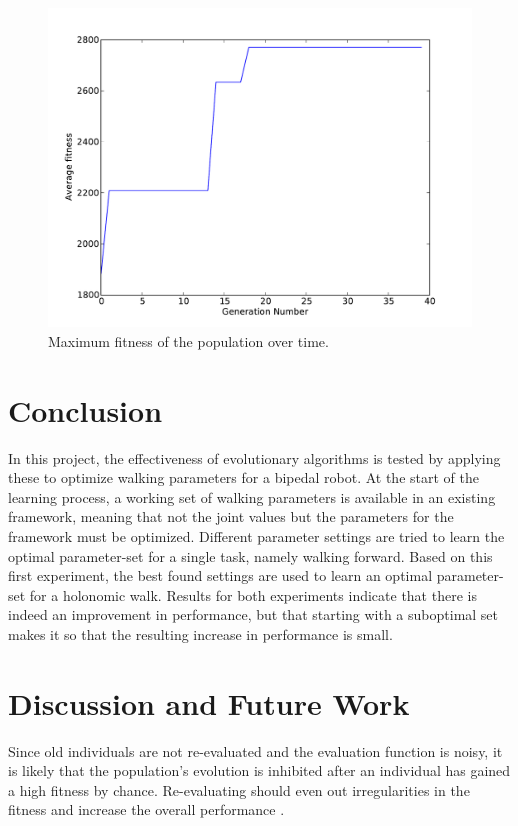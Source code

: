 \documentclass{article}
\begin{document}
\begin{figure}[h!]
	\center
	\includegraphics[width=.8\textwidth]{images/max_fitness}
	\caption{Maximum fitness of the population over time.}
	\label{fig:max}
\end{figure}
\newpage

\section{Conclusion}
In this project, the effectiveness of evolutionary algorithms is tested by applying these to optimize walking parameters for a bipedal robot. At the start of the learning process, a working set of walking parameters is available in an existing framework, meaning that not the joint values but the parameters for the framework must be optimized. Different parameter settings are tried to learn the optimal parameter-set for a single task, namely walking forward. Based on this first experiment, the best found settings are used to learn an optimal parameter-set for a holonomic walk. Results for both experiments indicate that there is indeed an improvement in performance, but that starting with a suboptimal set makes it so that the resulting increase in performance is small.

\section{Discussion and Future Work}
Since old individuals are not re-evaluated and the evaluation function is
noisy, it is likely that the population's evolution is inhibited after an
individual has gained a high fitness by chance. Re-evaluating should even out 
irregularities in the fitness and increase the overall performance
\cite{nordin1997line}.
\end{document}
